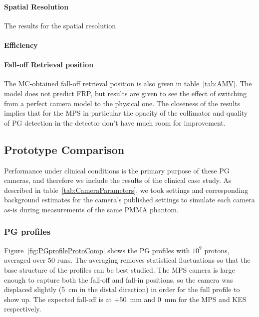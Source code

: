 \documentclass[a4paper,english,12pt]{article}
\begin{document}
\paragraph{Spatial Resolution} The results for the spatial resolution 

\paragraph{Efficiency}

\paragraph{Fall-off Retrieval position} The MC-obtained fall-off retrieval position is also given in table~\ref{tab:AMV}. The model does not predict FRP, but results are given to see the effect of switching from a perfect camera model to the physical one. The closeness of the results implies that for the MPS in particular the opacity of the collimator and quality of PG detection in the detector don't have much room for improvement.


\subsection{Prototype Comparison}

Performance under clinical conditions is the primary purpose of these PG cameras, and therefore we include the results of the clinical case study. As described in table~\ref{tab:CameraParameters}, we took settings and corresponding background estimates for the camera's published settings to simulate each camera as-is during measurements of the same PMMA phantom.

\subsubsection{PG profiles}

Figure~\ref{fig:PGprofileProtoComp} shows the PG profiles with $10^9$ protons, averaged over 50 runs. The averaging removes statistical fluctuations so that the base structure of the profiles can be best studied. The MPS camera is large enough to capture both the fall-off and fall-in positions, so the camera was displaced slightly (5~cm in the distal direction) in order for the full profile to show up. The expected fall-off is at $+50$~mm and 0~mm for the MPS and KES respectively.
\end{document}
